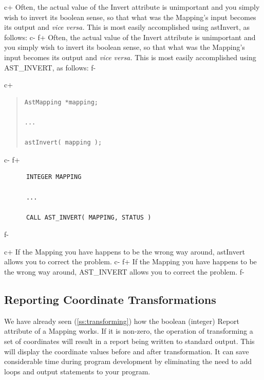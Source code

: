 \documentclass[twoside,11pt]{article}
\newcommand{\secref}[1]{\S\ref{#1}}
\renewcommand{\secref}[1]{\ref{#1}}
\begin{document}
c+
Often, the actual value of the Invert attribute is unimportant and you
simply wish to invert its boolean sense, so that what was the
Mapping's input becomes its output and {\em{vice versa.}} This is most
easily accomplished using astInvert, as follows:
c-
f+
Often, the actual value of the Invert attribute is unimportant and you
simply wish to invert its boolean sense, so that what was the
Mapping's input becomes its output and {\em{vice versa.}} This is most
easily accomplished using AST\_INVERT, as follows:
f-

c+
\begin{quote}
\small
\begin{verbatim}
AstMapping *mapping;

...

astInvert( mapping );
\end{verbatim}
\normalsize
\end{quote}
c-
f+
\small
\begin{verbatim}
      INTEGER MAPPING

      ...

      CALL AST_INVERT( MAPPING, STATUS )
\end{verbatim}
\normalsize
f-

c+
If the Mapping you have happens to be the wrong way around, astInvert
allows you to correct the problem.
c-
f+
If the Mapping you have happens to be the wrong way around,
AST\_INVERT allows you to correct the problem.
f-

\subsection{Reporting Coordinate Transformations}

We have already seen (\secref{ss:transforming}) how the boolean
(integer) Report attribute of a Mapping works. If it is non-zero, the
operation of transforming a set of coordinates will result in a report
being written to standard output. This will display the coordinate
values before and after transformation. It can save considerable time
during program development by eliminating the need to add loops and
output statements to your program.
\end{document}
